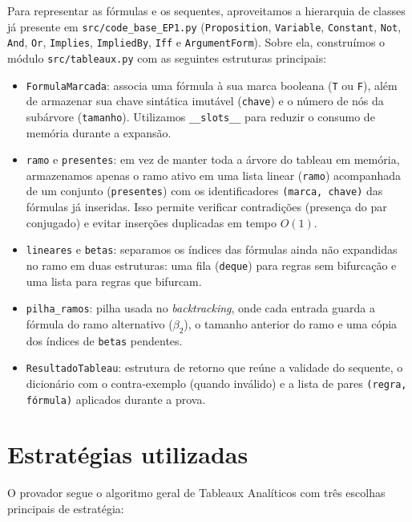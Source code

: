 \documentclass{article}
\begin{document}
Para representar as fórmulas e os sequentes, aproveitamos a hierarquia de classes já presente em \texttt{src/code\_base\_EP1.py} (\texttt{Proposition}, \texttt{Variable}, \texttt{Constant}, \texttt{Not}, \texttt{And}, \texttt{Or}, \texttt{Implies}, \texttt{ImpliedBy}, \texttt{Iff} e \texttt{ArgumentForm}). Sobre ela, construímos o módulo \texttt{src/tableaux.py} com as seguintes estruturas principais:

\begin{itemize}
    \item \texttt{FormulaMarcada}: associa uma fórmula à sua marca booleana (\texttt{T} ou \texttt{F}), além de armazenar sua chave sintática imutável (\texttt{chave}) e o número de nós da subárvore (\texttt{tamanho}). Utilizamos \texttt{\_\_slots\_\_} para reduzir o consumo de memória durante a expansão.
    \item \texttt{ramo} e \texttt{presentes}: em vez de manter toda a árvore do tableau em memória, armazenamos apenas o ramo ativo em uma lista linear (\texttt{ramo}) acompanhada de um conjunto (\texttt{presentes}) com os identificadores \texttt{(marca, chave)} das fórmulas já inseridas. Isso permite verificar contradições (presença do par conjugado) e evitar inserções duplicadas em tempo $O(1)$.
    \item \texttt{lineares} e \texttt{betas}: separamos os índices das fórmulas ainda não expandidas no ramo em duas estruturas: uma fila (\texttt{deque}) para regras sem bifurcação e uma lista para regras que bifurcam.
    \item \texttt{pilha\_ramos}: pilha usada no \emph{backtracking}, onde cada entrada guarda a fórmula do ramo alternativo ($\beta_2$), o tamanho anterior do ramo e uma cópia dos índices de \texttt{betas} pendentes.
    \item \texttt{ResultadoTableau}: estrutura de retorno que reúne a validade do sequente, o dicionário com o contra-exemplo (quando inválido) e a lista de pares \texttt{(regra, fórmula)} aplicados durante a prova.
\end{itemize}

\section*{Estratégias utilizadas}

O provador segue o algoritmo geral de Tableaux Analíticos com três escolhas principais de estratégia:
\end{document}
